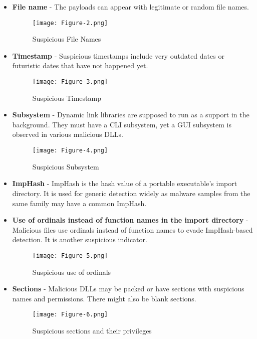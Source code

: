 \documentclass{article}
\begin{document}
\begin{itemize}
    \item \textbf{File name} -
    The payloads can appear with legitimate or random file names.
    \begin{figure}
        \centering
        \texttt{[image: Figure-2.png]}
        \caption{Suspicious File Names}
    \end{figure}

    \item \textbf{Timestamp} -
    Suspicious timestamps include very outdated dates or futuristic dates that have not happened yet.
    \begin{figure}[h]
        \centering
        \texttt{[image: Figure-3.png]}
        \caption{Suspicious Timestamp}
    \end{figure}

    \item \textbf{Subsystem} -
    Dynamic link libraries are supposed to run as a support in the background. They must have a CLI subsystem, yet a GUI subsystem is observed in various malicious DLLs.
    \begin{figure}[h]
        \centering
        \texttt{[image: Figure-4.png]}
        \caption{Suspicious Subsystem}
    \end{figure}

    \item \textbf{ImpHash} -
    ImpHash is the hash value of a portable executable’s import directory. It is used for generic detection widely as malware samples from the same family may have a common ImpHash.

    \item \textbf{Use of ordinals instead of function names in the import directory} -
    Malicious files use ordinals instead of function names to evade ImpHash-based detection. It is another suspicious indicator.
    \begin{figure}[h]
        \centering
        \texttt{[image: Figure-5.png]}
        \caption{Suspicious use of ordinals}
    \end{figure}

    \item \textbf{Sections} -
    Malicious DLLs may be packed or have sections with suspicious names and permissions. There might also be blank sections.
    \begin{figure}[h]
        \centering
        \texttt{[image: Figure-6.png]}
        \caption{Suspicious sections and their privileges}
    \end{figure}


\end{itemize}
\end{document}
